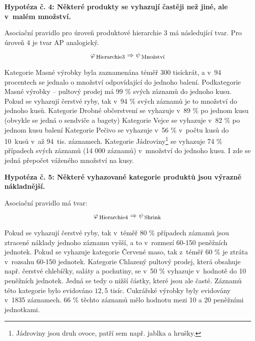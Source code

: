 
\textbf{Hypotéza č. 4: Některé produkty se vyhazují častěji než jiné, ale v~malém množství.}

Asociační pravidlo pro úroveň produktové hierarchie 3 má následující tvar. Pro úroveň 4 je tvar AP analogický.
\begin{equation}
    \varphi_{\mbox{\,\footnotesize Hierarchie3}} \Rightarrow \psi_{\mbox{\,\footnotesize Množství}}
\end{equation}

Kategorie Masné výrobky byla zaznamenána téměř 300 tisíckrát, a v~94 procentech se jednalo o množství odpovídající do jednoho balení. Podkategorie Masné výrobky -- pultový prodej má 99 \% svých záznamů do jednoho kusu.
Pokud se vyhazují čerstvé ryby, tak v~94 \% svých záznamů je to množství do jednoho kusů. Kategorie Drobné občerstvení %
 se vyhazuje v~89 \% po jednom kusu (obvykle se jedná o sendviče a bagety)
Kategorie Vejce se vyhazuje v~82 \% po jednom kusu balení
Kategorie Pečivo se vyhazuje v~56 \% v~počtu kusů do 10~kusů v~až 94~tis. záznamech.
Kategorie Jádroviny\footnote{Jádroviny jsou druh ovoce, patří sem např. jablka a hrušky.} se vyhazuje 74 \% případech svých záznamů (14 000 záznamů) v~množství do jednoho kusu. I zde se jedná přepočet váženého množství na kusy.

\vspace*{1em}

\textbf{Hypotéza č. 5: Některé vyhazované kategorie produktů jsou výrazně nákladnější.}

Asociační pravidlo má tvar:
\begin{equation}
    \varphi_{\mbox{\,\footnotesize Hierarchie4}} \Rightarrow \psi_{\mbox{\,\footnotesize Shrink}}
\end{equation}

Pokud se vyhazují čerstvé ryby, tak v~téměř 80 \% případech záznamů jsou ztracené náklady jednoho záznamu vyšší, a to v~rozmezí 60-150 peněžních jednotek.
Pokud se vyhazuje kategorie Červené maso, tak z~téměř 60 \% je ztráta v~rozsahu 60-150 jednotek.
Kategorie Chlazený pultový prodej, která obsahuje např. čerstvé chlebíčky, saláty a pochutiny, se v~50 \% vyhazuje v~hodnotě do 10 peněžních jednotek. Jedná se tedy o nižší částky, které jsou ale časté. Záznamů této kategorie bylo evidováno $12{,}5$ tisíc.
Cukrářské výrobky byly evidovány v~1835 záznamech. 66 \% těchto záznamů mělo hodnotu mezi 10 a 20 peněžními jednotkami.

